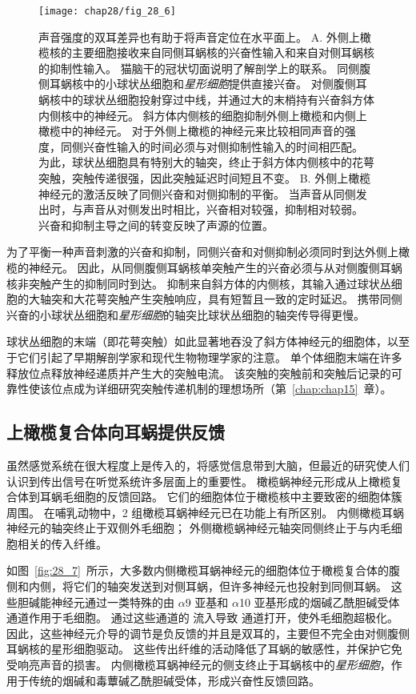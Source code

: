 \begin{figure}[htbp]
	\centering
	\texttt{[image: chap28/fig\_28\_6]}
	\caption{声音强度的双耳差异也有助于将声音定位在水平面上。
		A. 外侧上橄榄核的主要细胞接收来自同侧耳蜗核的兴奋性输入和来自对侧耳蜗核的抑制性输入。
		猫脑干的冠状切面说明了解剖学上的联系。
		同侧腹侧耳蜗核中的小球状丛细胞和\textit{星形细胞}提供直接兴奋。 
		对侧腹侧耳蜗核中的球状丛细胞投射穿过中线，并通过大的末梢持有兴奋斜方体内侧核中的神经元。
		斜方体内侧核的细胞抑制外侧上橄榄和内侧上橄榄中的神经元。
		对于外侧上橄榄的神经元来比较相同声音的强度，同侧兴奋性输入的时间必须与对侧抑制性输入的时间相匹配。
		为此，球状丛细胞具有特别大的轴突，终止于斜方体内侧核中的花萼突触，突触传递很强，因此突触延迟时间短且不变。
		B. 外侧上橄榄神经元的激活反映了同侧兴奋和对侧抑制的平衡。
		当声音从同侧发出时，与声音从对侧发出时相比，兴奋相对较强，抑制相对较弱。
		兴奋和抑制主导之间的转变反映了声源的位置。}
	\label{fig:28_6}
\end{figure}


为了平衡一种声音刺激的兴奋和抑制，同侧兴奋和对侧抑制必须同时到达外侧上橄榄的神经元。
因此，从同侧腹侧耳蜗核单突触产生的兴奋必须与从对侧腹侧耳蜗核非突触产生的抑制同时到达。
抑制来自斜方体的内侧核，其输入通过球状丛细胞的大轴突和大花萼突触产生突触响应，具有短暂且一致的定时延迟。
携带同侧兴奋的小球状丛细胞和\textit{星形细胞}的轴突比球状丛细胞的轴突传导得更慢。


球状丛细胞的末端（即花萼突触）如此显著地吞没了斜方体神经元的细胞体，以至于它们引起了早期解剖学家和现代生物物理学家的注意。
单个体细胞末端在许多释放位点释放神经递质并产生大的突触电流。
该突触的突触前和突触后记录的可靠性使该位点成为详细研究突触传递机制的理想场所（第~\ref{chap:chap15}~章）。



\subsection{上橄榄复合体向耳蜗提供反馈}

虽然感觉系统在很大程度上是传入的，将感觉信息带到大脑，但最近的研究使人们认识到传出信号在听觉系统许多层面上的重要性。
橄榄蜗神经元形成从上橄榄复合体到耳蜗毛细胞的反馈回路。
它们的细胞体位于橄榄核中主要致密的细胞体簇周围。
在哺乳动物中，2 组橄榄耳蜗神经元已在功能上有所区别。
内侧橄榄耳蜗神经元的轴突终止于双侧外毛细胞；
外侧橄榄蜗神经元轴突同侧终止于与内毛细胞相关的传入纤维。


如图~\ref{fig:28_7}~所示，大多数内侧橄榄耳蜗神经元的细胞体位于橄榄复合体的腹侧和内侧，将它们的轴突发送到对侧耳蜗，但许多神经元也投射到同侧耳蜗。
这些胆碱能神经元通过一类特殊的由 $\alpha$9 亚基和 $\alpha$10 亚基形成的烟碱乙酰胆碱受体通道作用于毛细胞。
通过这些通道的  流入导致  通道打开，使外毛细胞超极化。
因此，这些神经元介导的调节是负反馈的并且是双耳的，主要但不完全由对侧腹侧耳蜗核的星形细胞驱动。
这些传出纤维的活动降低了耳蜗的敏感性，并保护它免受响亮声音的损害。
内侧橄榄耳蜗神经元的侧支终止于耳蜗核中的\textit{星形细胞}，作用于传统的烟碱和毒蕈碱乙酰胆碱受体，形成兴奋性反馈回路。


